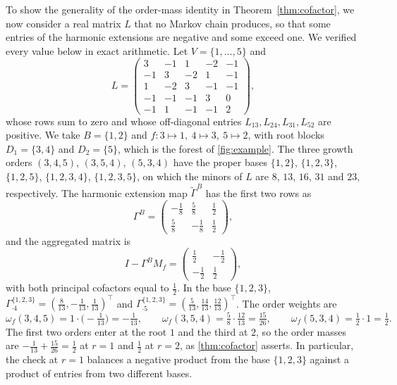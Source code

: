 \documentclass[onefignum,onetabnum]{siamart250211}
\numberwithin{theorem}{section}
\numberwithin{equation}{section}
\begin{document}
\begin{example}\label{ex:signed}
To show the generality of the order-mass identity in Theorem~\ref{thm:cofactor}, we now consider a real matrix $L$ that no Markov chain produces, so
that some entries of the harmonic extensions are negative and some
exceed one. We verified every value below in exact arithmetic. Let
$V=\{1,\dots,5\}$ and
\[
L=\begin{pmatrix}
3&-1&1&-2&-1\\
-1&3&-2&1&-1\\
1&-2&3&-1&-1\\
-1&-1&-1&3&0\\
-1&1&-1&-1&2
\end{pmatrix},
\]
whose rows sum to zero and whose off-diagonal entries
$L_{13},L_{24},L_{31},L_{52}$ are positive. We take $B=\{1,2\}$ and
$f:3\mapsto1,\ 4\mapsto3,\ 5\mapsto2$, with root blocks $D_1=\{3,4\}$
and $D_2=\{5\}$, which is the forest of \cref{fig:example}. The three growth orders $(3,4,5)$, $(3,5,4)$, $(5,3,4)$
have the proper bases $\{1,2\}$, $\{1,2,3\}$, $\{1,2,5\}$, $\{1,2,3,4\}$,
$\{1,2,3,5\}$, on which the minors of $L$ are $8$, $13$, $16$, $31$
and $23$, respectively. The harmonic extension map $\tilde\Gamma^B$ has the first two rows as
\[
\Gamma^{B}=\begin{pmatrix}-\tfrac18&\tfrac58&\tfrac12\\[2pt]
\tfrac58&-\tfrac18&\tfrac12\end{pmatrix},
\]
and the aggregated matrix is
\[I-\Gamma^BM_f
=\left(\begin{smallmatrix}\frac12&-\frac12\\-\frac12&\frac12\end{smallmatrix}\right),\]
with both principal cofactors equal to $\tfrac12$. In the base
$\{1,2,3\}$,
$\Gamma^{\{1,2,3\}}_{\cdot4}=(\tfrac8{13},-\tfrac1{13},\tfrac1{13})^{\top}$
and
$\Gamma^{\{1,2,3\}}_{\cdot5}=(\tfrac5{13},\tfrac{14}{13},\tfrac{12}{13})^{\top}$. The order weights are
\[
\omega_f(3,4,5)= 1\cdot\big(-\tfrac1{13}\big)=-\tfrac1{13},\qquad
\omega_f(3,5,4)= \tfrac58\cdot\tfrac{12}{13}=\tfrac{15}{26},\qquad
\omega_f(5,3,4)= \tfrac12\cdot1=\tfrac12 .
\]
The first two orders enter at the root $1$ and the third at $2$, so the
order masses are $-\tfrac1{13}+\tfrac{15}{26}=\tfrac12$ at $r=1$ and
$\tfrac12$ at $r=2$, as \cref{thm:cofactor} asserts. In particular, the
check at $r=1$ balances a negative product from the base $\{1,2,3\}$ against a
product of entries from two different bases.
\end{example}
\end{document}
